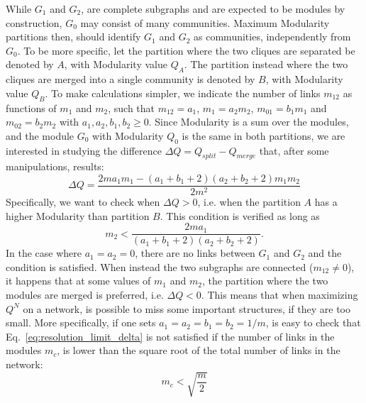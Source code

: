 While $G_1$ and $G_2$, are complete subgraphs and are expected to be modules by construction, $G_0$ may consist of many communities. Maximum Modularity partitions then, should identify $G_1$ and $G_2$ as communities, independently from $G_0$. To be more specific, let the partition where the two cliques are separated be denoted by $A$, with Modularity value $Q_A$. The partition instead where the two cliques are merged into a single community is denoted by $B$, with Modularity value $Q_B$.
To make calculations simpler, we indicate the number of links $m_{12}$ as functions of $m_1$ and $m_2$, such that $m_{12}=a_{1}$, $m_1=a_2 m_2$, $m_{01}=b_1 m_1$ and $m_{02}=b_2 m_2$ with $a_1,a_2,b_1,b_2 \geq 0$.
Since Modularity is a sum over the modules, and the module $G_0$ with Modularity $Q_0$ is the same in both partitions, we are interested in studying the difference $\Delta Q = Q_{split} - Q_{merge}$ that, after some manipulations, results:
\begin{equation} \label{eq:resolution_limit_delta}
\Delta Q = \frac{2 m a_1 m_1 - (a_1+b_1+2)(a_2+b_2+2)m_1 m_2}{2m^2}
\end{equation}
Specifically, we want to check when $\Delta Q > 0$, i.e. when the partition $A$ has a higher Modularity than partition $B$. This condition is verified as long as
\begin{equation}
m_2 < \frac{2m a_1}{(a_1+b_1+2)(a_2+b_2+2)}.
\end{equation}
In the case where $a_1=a_2=0$, there are no links between $G_1$ and $G_2$ and the condition is satisfied. When instead the two subgraphs are connected ($m_{12} \neq 0$), it happens that at some values of $m_1$ and $m_2$, the partition where the two modules are merged is preferred, i.e. $\Delta Q <0$. This means that when maximizing $Q^N$ on a network, is possible to miss some important structures, if they are too small.
More specifically, if one sets $a_1=a_2=b_1=b_2=1/m$, is easy to check that Eq.~\ref{eq:resolution_limit_delta} is not satisfied if the number of links in the modules $m_c$, is lower than the square root of the total number of links in the network:
\begin{equation}
m_c < \sqrt{\frac{m}{2}}
\end{equation}

